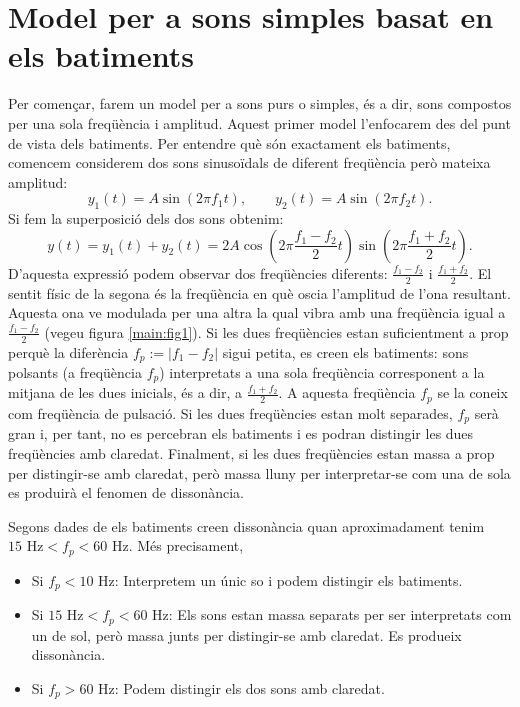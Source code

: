 \documentclass{article}
\theoremstyle{definition}
\begin{document}
\section{Model per a sons simples basat en els batiments}
Per començar, farem un model per a sons purs o simples, és a dir, sons compostos per una sola freqüència i amplitud. Aquest primer model l'enfocarem des del punt de vista dels batiments. Per entendre què són exactament els batiments, comencem considerem dos sons sinusoïdals de diferent freqüència però mateixa amplitud: $$y_1(t)=A\sin(2\pi f_1 t),\qquad y_2(t)=A\sin(2\pi f_2 t).$$
Si fem la superposició dels dos sons obtenim: $$y(t)=y_1(t)+y_2(t)=2A\cos\left(2\pi\frac{f_1-f_2}{2}t\right)\sin\left(2\pi\frac{f_1+f_2}{2}t\right).$$
D'aquesta expressió podem observar dos freqüències diferents: $\frac{f_1-f_2}{2}$ i $\frac{f_1+f_2}{2}$. El sentit físic de la segona és la freqüència en què osci\lgem a l'amplitud de l'ona resultant. Aquesta ona ve modulada per una altra la qual vibra amb una freqüència igual a $\frac{f_1-f_2}{2}$ (vegeu figura \ref{main:fig1}). Si les dues freqüències estan suficientment a prop perquè la diferència $f_p:=|f_1-f_2|$ sigui petita, es creen els batiments: sons polsants (a freqüència $f_p$) interpretats a una sola freqüència corresponent a la mitjana de les dues inicials, és a dir, a $\frac{f_1+f_2}{2}$. A aquesta freqüència $f_p$ se la coneix com freqüència de pulsació. Si les dues freqüències estan molt separades, $f_p$ serà gran i, per tant, no es percebran els batiments i es podran distingir les dues freqüències amb claredat. Finalment, si les dues freqüències estan massa a prop per distingir-se amb claredat, però massa lluny per interpretar-se com una de sola es produirà el fenomen de dissonància.
\begin{center}
    
    \label{main:fig1}
\end{center}
Segons dades de \cite{gibson} els batiments creen dissonància quan aproximadament tenim $15\text{ Hz}<f_p<60\text{ Hz}$. Més precisament,
\begin{itemize}
    \item Si $f_p<10\text{ Hz}$: Interpretem un únic so i podem distingir els batiments.
    \item Si $15\text{ Hz}<f_p<60\text{ Hz}$: Els sons estan massa separats per ser interpretats com un de sol, però massa junts per distingir-se amb claredat. Es produeix dissonància.
    \item Si $f_p>60\text{ Hz}$: Podem distingir els dos sons amb claredat.
\end{itemize}
\end{document}
